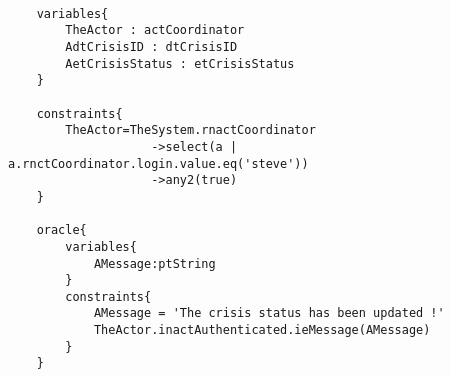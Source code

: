 	\scriptsize
	\vspace{0.5cm}
	\begin{lstlisting}[style=MessirStyle,firstnumber=auto,captionpos=b,caption={\msrmessir (MCL-oriented) specification of the test step \emph{testcase01-ts17oeSetCrisisStatus}.},label=TM-testcase01-ts17oeSetCrisisStatus-MCL-LST]

	variables{
		TheActor : actCoordinator
		AdtCrisisID : dtCrisisID
		AetCrisisStatus : etCrisisStatus
	}
	
	constraints{
		TheActor=TheSystem.rnactCoordinator
		            ->select(a | a.rnctCoordinator.login.value.eq('steve'))
		            ->any2(true)
	}
	
	oracle{
		variables{
			AMessage:ptString
		}
		constraints{
			AMessage = 'The crisis status has been updated !'
			TheActor.inactAuthenticated.ieMessage(AMessage)
		}
	}
	
	\end{lstlisting}
	\normalsize 
	
	
